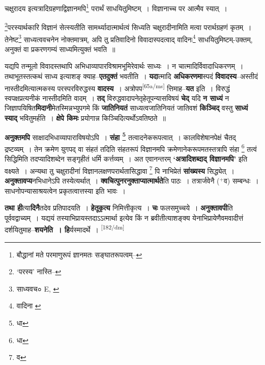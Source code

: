 \documentclass[article,12pt,a4paper]{memoir}
\newcommand{\add}[1]{($^{+}$#1)}
\begin{document}
	  \pstart चक्षुरादय इत्यत्रादिग्रहणाद्विज्ञानमपि\footnote{बौद्धानां मते परमाणुरूपं ज्ञानमतः सङ्घातरूपत्वम्--\cite{dp-msD-n}} परार्थं साधयितुमिष्टम् । विज्ञानाच्च पर आत्मैव स्यात् ।
	\pend
       

	  \pstart \footnote{‘परस्य’ नास्ति--\cite{dp-msB}}परस्यार्थकारि विज्ञानं सेत्स्यतीति सामर्थ्यादात्मार्थत्वं सिध्यति चक्षुरादीनामिति मत्वा परार्थग्रहणं कृतम् । तेनेष्ट\footnote{साध्यवच० \cite{dp-msA} \cite{dp-msB} \cite{dp-edP} \cite{dp-edH} E, \cite{dp-edN}} साध्यत्ववचनेन नोक्तमात्रम्, अपि तु प्रतिवादिनो विवादास्पदत्वाद् वादिनः\footnote{वादिना \cite{dp-edE}} साधयितुमिष्टम्-उक्तम्, अनुक्तं वा प्रकरणगम्यं साध्यमित्युक्तं भवति ॥
	\pend
      

	  \pstart यद्यपि तन्मूलो विवादस्तथापि अभिधाव्यापारविश्रामभूमिरेवार्थः साध्यः । न चात्मादिर्विवादाधिकरणम् । तथाभूतस्तत्कथं साध्य इत्याशङ् क्याह--\textbf{एतदुक्तं} भवतीति । \textbf{यदा}त्मादि \textbf{अधिकरणमा}स्पदं \textbf{विवादस्य}--अस्तीदं नास्तीदमित्यात्मकस्य परस्परविरुद्धस्य \textbf{वादस्य} । अत्रोपप\leavevmode\textsuperscript{\rmlatinfont\tiny [65a/ms]} त्तिमाह--\textbf{यत} इति । विरुद्धं स्वपक्षप्रत्यनीकं नास्तीदमिति वादम् । \textbf{तद्} विरुद्धवादापनेतृहेतूपन्यासविषयं \textbf{चेद्} यदि \textbf{न साध्यं} न जिज्ञापयिषित\textbf{मिदानी}मेतस्मिन्नभ्युपगमे किं \textbf{जातिनियतं} साध्यत्वजातिनियतं जातिवशं \textbf{किञ्चिद्} वस्तु \textbf{साध्यं स्याद्} भवितुमर्हति । \textbf{क्षेपे किमः} प्रयोगान्न किञ्चिदित्यर्थोऽवतिष्ठते ॥
	\pend
      

	  \pstart \textbf{अनुक्तमपि} साक्षादभिधाव्यापाराविषयोऽपि । \textbf{संहा \footnote{धा}} तत्वादनेकरूपत्वात् । कालविशेषानपेक्षं चैतद् द्रष्टव्यम् । तेन क्रमेण युगपद् वा संहतं तदिति संहतरूपं विज्ञानमपि क्रमेणानेकरूपमतस्तत्रापि संहा \footnote{धा} तत्वं सिद्धिमिति तदप्यादिशब्देन सङ्गृहीतं धर्मि कर्त्तव्यम् । अत एवानन्तरम् \textbf{‘अत्रादिशब्दाद् विज्ञानमपि’} इति वक्ष्यते । अन्यथा तु चक्षुरादीनां विज्ञानलक्षणपरार्थतासिद्धावा \footnote{व} पि नाभिप्रेतं \textbf{सांख्यस्य} सिद्ध्येत् । \textbf{अनुक्तावप्य}नभिधानेऽपि तस्येत्यर्थात् । \textbf{क्वचित्पुनरनुक्ताप्यात्मार्थते}ति पाठः । तत्रार्जवेनै \add{व} सम्बन्धः । साधनोपन्यासाश्रयत्वेन प्रकृतत्वात्तस्या इति भावः ।
	\pend
      

	  \pstart \textbf{तथा ही}त्या\textbf{दिनै}तदेव प्रतिपादयति । \textbf{हेतूकृत्य} निमित्तीकृत्य । \textbf{चः} फलसमुच्चये । \textbf{अनुक्तावपी}ति पूर्ववद्वाच्यम् । यद्ययं तस्याभिप्रायस्तदाऽऽत्मार्था इत्येव किं न ब्रवीतीत्याशङ्क्य येनाभिप्रायेणैवमवादीत्तं दर्शयितुमाह--\textbf{शयनेति । हि}र्यस्मादर्थे ।
	\pend
      \leavevmode\textsuperscript{\rmlatinfont\tiny [182/dm]}
\end{document}
